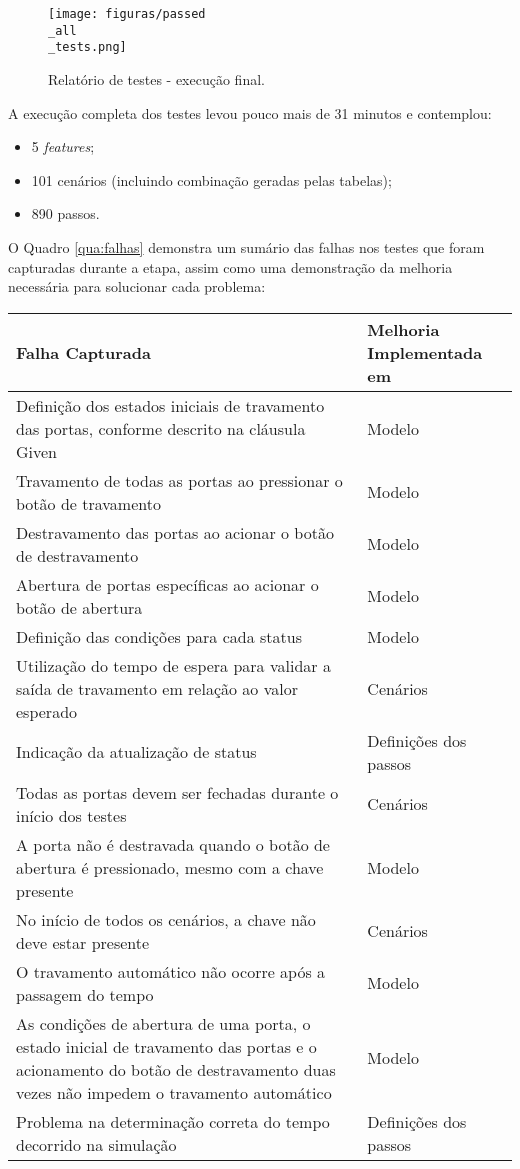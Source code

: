 \begin{figure}[H]
\centering
\texttt{[image: figuras/passed\\\_all\\\_tests.png]}
\caption{Relatório de testes - execução final.}
\label{fig:resultado-terminal}
\end{figure}

A execução completa dos testes levou pouco mais de 31 minutos e contemplou:

\begin{itemize}
    \item 5 \textit{features};
    \item 101 cenários (incluindo combinação geradas pelas tabelas);
    \item 890 passos.
\end{itemize}

O Quadro \ref{qua:falhas} demonstra um sumário das falhas nos testes que foram capturadas durante a etapa, assim como uma demonstração da melhoria 
necessária para solucionar cada problema:

\begin{quadro}[H]
\caption{Falhas de comportamento capturadas durante a modelagem iterativa}
\label{qua:falhas}
\begin{tabular}{|p{7cm}|p{5cm}|}
\hline
Falha Capturada & Melhoria Implementada em \\ 
\hline
Definição dos estados iniciais de travamento das portas, conforme descrito na cláusula Given & Modelo \\
\hline
Travamento de todas as portas ao pressionar o botão de travamento & Modelo \\
\hline
Destravamento das portas ao acionar o botão de destravamento & Modelo \\
\hline
Abertura de portas específicas ao acionar o botão de abertura & Modelo \\
\hline
Definição das condições para cada status & Modelo \\
\hline
Utilização do tempo de espera para validar a saída de travamento em relação ao valor esperado & Cenários \\
\hline
Indicação da atualização de status & Definições dos passos \\
\hline
Todas as portas devem ser fechadas durante o início dos testes & Cenários \\
\hline
A porta não é destravada quando o botão de abertura é pressionado, mesmo com a chave presente & Modelo \\
\hline
No início de todos os cenários, a chave não deve estar presente & Cenários \\
\hline
O travamento automático não ocorre após a passagem do tempo & Modelo \\
\hline
As condições de abertura de uma porta, o estado inicial de travamento das portas e o acionamento do botão de destravamento duas vezes não impedem o travamento automático & Modelo \\
\hline
Problema na determinação correta do tempo decorrido na simulação & Definições dos passos  \\
\hline
\end{tabular}
\end{quadro}

